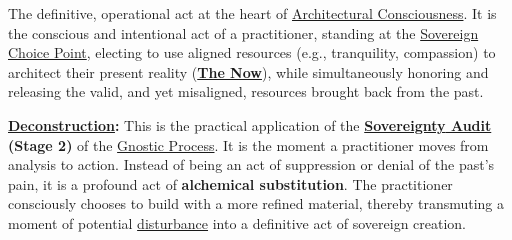\item[\hypertarget{gloss:sovereign_choice}{Sovereign Choice}] 
    The definitive, operational act at the heart of \hyperlink{gloss:architectural_consciousness}{Architectural Consciousness}. It is the conscious and intentional act of a practitioner, standing at the \hyperlink{gloss:sovereign_choice_point}{Sovereign Choice Point}, electing to use aligned resources (e.g., tranquility, compassion) to architect their present reality (\textbf{\hyperlink{gloss:the_now}{The Now}}), while simultaneously honoring and releasing the valid, and yet misaligned, resources brought back from the past.
    \begin{nobullet}
        \item \textbf{\hyperlink{gloss:deconstruction}{Deconstruction}:} This is the practical application of the \textbf{\hyperlink{gloss:sovereignty_audit}{\hyperlink{gloss:sovereignty}{\hyperlink{gloss:sovereignty}{Sovereignty}} Audit} (Stage 2)} of the \hyperlink{gloss:gnostic_process}{Gnostic Process}. It is the moment a practitioner moves from analysis to action. Instead of being an act of suppression or denial of the past's pain, it is a profound act of \textbf{alchemical substitution}. The practitioner consciously chooses to build with a more refined material, thereby transmuting a moment of potential \hyperlink{gloss:disturbance}{disturbance} into a definitive act of sovereign creation.
    \end{nobullet}

